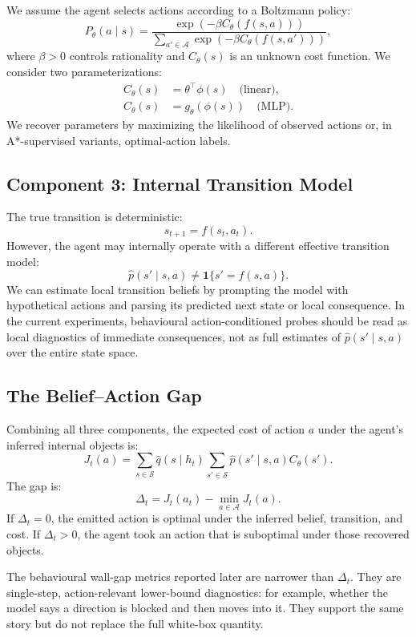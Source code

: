 \documentclass[11pt,a4paper]{article}
\newcommand{\A}{\mathcal{A}}
\newcommand{\Sspace}{\mathcal{S}}
\newcommand{\qhat}{\hat q}
\newcommand{\phat}{\hat p}
\begin{document}
We assume the agent selects actions according to a Boltzmann policy:
\[
P_\theta(a\mid s) = \frac{\exp(-\beta C_\theta(f(s,a)))}{\sum_{a'\in\A}\exp(-\beta C_\theta(f(s,a')))},
\]
where $\beta>0$ controls rationality and $C_\theta(s)$ is an unknown cost function. We consider two parameterizations:
\begin{align}
C_\theta(s) &= \theta^\top\phi(s) \quad \text{(linear)},\\
C_\theta(s) &= g_\theta(\phi(s)) \quad \text{(MLP)}.
\end{align}
We recover parameters by maximizing the likelihood of observed actions or, in A*-supervised variants, optimal-action labels.

\subsection{Component 3: Internal Transition Model}

The true transition is deterministic:
\[
s_{t+1}=f(s_t,a_t).
\]
However, the agent may internally operate with a different effective transition model:
\[
\phat(s'\mid s,a)\neq \mathbf{1}\{s'=f(s,a)\}.
\]
We can estimate local transition beliefs by prompting the model with hypothetical actions and parsing its predicted next state or local consequence. In the current experiments, behavioural action-conditioned probes should be read as local diagnostics of immediate consequences, not as full estimates of $\phat(s'\mid s,a)$ over the entire state space.

\subsection{The Belief--Action Gap}

Combining all three components, the expected cost of action $a$ under the agent's inferred internal objects is:
\[
J_t(a)=\sum_{s\in\Sspace}\qhat(s\mid h_t)\sum_{s'\in\Sspace}\phat(s'\mid s,a)C_\theta(s').
\]
The gap is:
\[
\Delta_t = J_t(a_t)-\min_{a\in\A}J_t(a).
\]
If $\Delta_t=0$, the emitted action is optimal under the inferred belief, transition, and cost. If $\Delta_t>0$, the agent took an action that is suboptimal under those recovered objects.

\begin{insight}
The behavioural wall-gap metrics reported later are narrower than $\Delta_t$. They are single-step, action-relevant lower-bound diagnostics: for example, whether the model says a direction is blocked and then moves into it. They support the same story but do not replace the full white-box quantity.
\end{insight}
\end{document}
